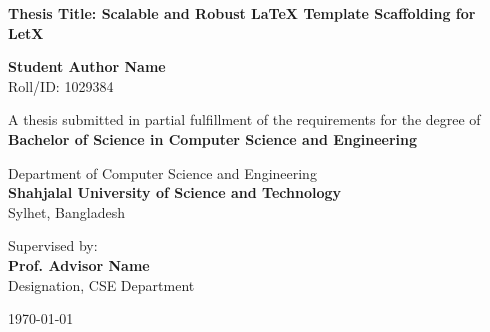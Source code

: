 \begin{titlepage}
\begin{center}
    \vspace*{1cm}
    
    
    \vspace{1.5cm}
    
    {\huge \bfseries \color{primary} Thesis Title: Scalable and Robust LaTeX Template Scaffolding for LetX}
    
    \vspace{1.5cm}
    
    {\Large \bfseries Student Author Name} \\
    \vspace{0.2cm}
    {Roll/ID: 1029384}
    
    \vspace{1.5cm}
    
    {A thesis submitted in partial fulfillment of the requirements for the degree of} \\
    \vspace{0.3cm}
    {\large \bfseries \color{secondary} Bachelor of Science in Computer Science and Engineering}
    
    \vspace{1.5cm}
    
    {Department of Computer Science and Engineering} \\
    \vspace{0.2cm}
    {\large \bfseries \color{primary} Shahjalal University of Science and Technology} \\
    \vspace{0.1cm}
    {Sylhet, Bangladesh}
    
    \vfill
    
    {Supervised by:} \\
    {\large \bfseries Prof. Advisor Name} \\
    {Designation, CSE Department}
    
    \vspace{1cm}
    
    {\large \today}
    
\end{center}
\end{titlepage}

